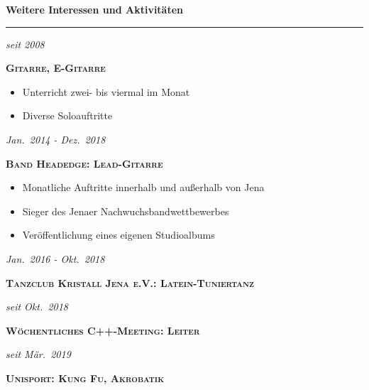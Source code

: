 \documentclass[8pt]{article}
\newcommand{\cvSectionStyle}{%
  \normalfont%
  \Large%
  \color{cvColor}%
  \bfseries%
  \sffamily%
}
\newcommand{\cvTimeStyle}{%
  \normalfont%
  \sffamily%
  \footnotesize%
  \itshape%
}
\newcommand{\cvSection}[1]{%
  \smallskip%
  {%
    \cvSectionStyle #1%
  }\\[-0.5em]
  \rule{\linewidth}{0.8pt}%
  \par%
  \smallskip%
}
\newenvironment{cvItemize}{%
  \begin{itemize}[itemsep=0mm, leftmargin=4mm]
}{%
  \end{itemize}
}
\newenvironment{cvTimeItem}[2]{
  \par
  \begin{minipage}[c]{0.15\linewidth}
    \raggedleft
    \cvTimeStyle #1
  \end{minipage}
  \quad
  \vrule
  \quad
  \begin{minipage}[t]{0.79\linewidth}
    \sffamily\textsc{\color{cvColor} \textbf{#2}}
    \normalfont\footnotesize\sffamily
}{
  \end{minipage}
  \par%
  \vspace{\baselineskip}%
}
\begin{document}
  \cvSection{Weitere Interessen und Aktivitäten}
  \begin{multicols}{2}
  \begin{cvTimeItem}{seit 2008}{Gitarre, E-Gitarre}
    \begin{cvItemize}
      \item Unterricht zwei- bis viermal im Monat
      \item Diverse Soloauftritte
    \end{cvItemize}
  \end{cvTimeItem}
  \begin{cvTimeItem}{Jan.~2014 - Dez.~2018}{Band Headedge: Lead-Gitarre}
    \begin{cvItemize}
      \item Monatliche Auftritte innerhalb und außerhalb von Jena
      \item Sieger des Jenaer Nachwuchsbandwettbewerbes
      \item Veröffentlichung eines eigenen Studioalbums
    \end{cvItemize}
  \end{cvTimeItem}
  \begin{cvTimeItem}{Jan.~2016 - Okt.~2018}{Tanzclub Kristall Jena e.V.: Latein-Tuniertanz}
  \end{cvTimeItem}
  \begin{cvTimeItem}{seit Okt.~2018}{Wöchentliches C++-Meeting: Leiter}
  \end{cvTimeItem}
  \begin{cvTimeItem}{seit Mär.~2019}{Unisport: Kung Fu, Akrobatik}
  \end{cvTimeItem}
  \end{multicols}
\end{document}
